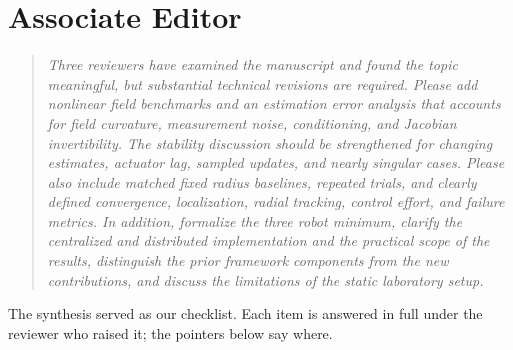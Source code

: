 \documentclass[10pt]{article}
\begin{document}
\newpage
\section*{Associate Editor}

\begin{quote}\itshape
Three reviewers have examined the manuscript and found the topic meaningful, but substantial technical revisions are required. Please add nonlinear field benchmarks and an estimation error analysis that accounts for field curvature, measurement noise, conditioning, and Jacobian invertibility. The stability discussion should be strengthened for changing estimates, actuator lag, sampled updates, and nearly singular cases. Please also include matched fixed radius baselines, repeated trials, and clearly defined convergence, localization, radial tracking, control effort, and failure metrics. In addition, formalize the three robot minimum, clarify the centralized and distributed implementation and the practical scope of the results, distinguish the prior framework components from the new contributions, and discuss the limitations of the static laboratory setup.
\end{quote}

The synthesis served as our checklist. Each item is answered in full under the reviewer who raised it; the pointers below say where.
\end{document}

